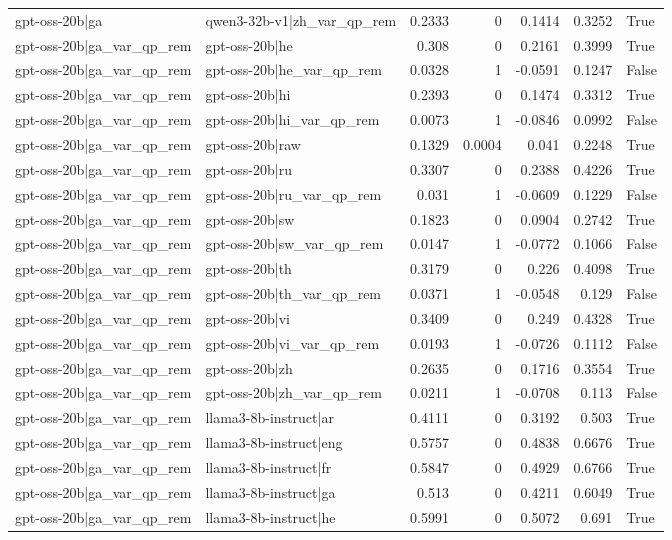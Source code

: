 \begin{table}
\begin{tabular}{l l r r r r l}
gpt-oss-20b|ga & qwen3-32b-v1|zh_var_qp_rem & 0.2333 & 0 & 0.1414 & 0.3252 & True \\
gpt-oss-20b|ga_var_qp_rem & gpt-oss-20b|he & 0.308 & 0 & 0.2161 & 0.3999 & True \\
gpt-oss-20b|ga_var_qp_rem & gpt-oss-20b|he_var_qp_rem & 0.0328 & 1 & -0.0591 & 0.1247 & False \\
gpt-oss-20b|ga_var_qp_rem & gpt-oss-20b|hi & 0.2393 & 0 & 0.1474 & 0.3312 & True \\
gpt-oss-20b|ga_var_qp_rem & gpt-oss-20b|hi_var_qp_rem & 0.0073 & 1 & -0.0846 & 0.0992 & False \\
gpt-oss-20b|ga_var_qp_rem & gpt-oss-20b|raw & 0.1329 & 0.0004 & 0.041 & 0.2248 & True \\
gpt-oss-20b|ga_var_qp_rem & gpt-oss-20b|ru & 0.3307 & 0 & 0.2388 & 0.4226 & True \\
gpt-oss-20b|ga_var_qp_rem & gpt-oss-20b|ru_var_qp_rem & 0.031 & 1 & -0.0609 & 0.1229 & False \\
gpt-oss-20b|ga_var_qp_rem & gpt-oss-20b|sw & 0.1823 & 0 & 0.0904 & 0.2742 & True \\
gpt-oss-20b|ga_var_qp_rem & gpt-oss-20b|sw_var_qp_rem & 0.0147 & 1 & -0.0772 & 0.1066 & False \\
gpt-oss-20b|ga_var_qp_rem & gpt-oss-20b|th & 0.3179 & 0 & 0.226 & 0.4098 & True \\
gpt-oss-20b|ga_var_qp_rem & gpt-oss-20b|th_var_qp_rem & 0.0371 & 1 & -0.0548 & 0.129 & False \\
gpt-oss-20b|ga_var_qp_rem & gpt-oss-20b|vi & 0.3409 & 0 & 0.249 & 0.4328 & True \\
gpt-oss-20b|ga_var_qp_rem & gpt-oss-20b|vi_var_qp_rem & 0.0193 & 1 & -0.0726 & 0.1112 & False \\
gpt-oss-20b|ga_var_qp_rem & gpt-oss-20b|zh & 0.2635 & 0 & 0.1716 & 0.3554 & True \\
gpt-oss-20b|ga_var_qp_rem & gpt-oss-20b|zh_var_qp_rem & 0.0211 & 1 & -0.0708 & 0.113 & False \\
gpt-oss-20b|ga_var_qp_rem & llama3-8b-instruct|ar & 0.4111 & 0 & 0.3192 & 0.503 & True \\
gpt-oss-20b|ga_var_qp_rem & llama3-8b-instruct|eng & 0.5757 & 0 & 0.4838 & 0.6676 & True \\
gpt-oss-20b|ga_var_qp_rem & llama3-8b-instruct|fr & 0.5847 & 0 & 0.4929 & 0.6766 & True \\
gpt-oss-20b|ga_var_qp_rem & llama3-8b-instruct|ga & 0.513 & 0 & 0.4211 & 0.6049 & True \\
gpt-oss-20b|ga_var_qp_rem & llama3-8b-instruct|he & 0.5991 & 0 & 0.5072 & 0.691 & True \\

\end{tabular}
\end{table}
